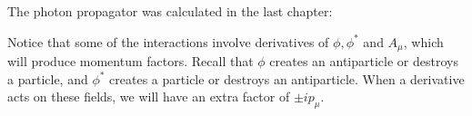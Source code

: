 \documentclass[11pt]{article}
\theoremstyle{definition}
\begin{document}
The photon propagator was calculated in the last chapter:
\begin{center}
\end{center}

Notice that some of the interactions involve derivatives of $\phi, \phi^*$ and $A_\mu$, which will produce momentum factors. Recall that $\phi$ creates an antiparticle or destroys a particle, and $\phi^*$ creates a particle or destroys an antiparticle. When a derivative acts on these fields, we will have an extra factor of $\pm ip_\mu$.
\end{document}
